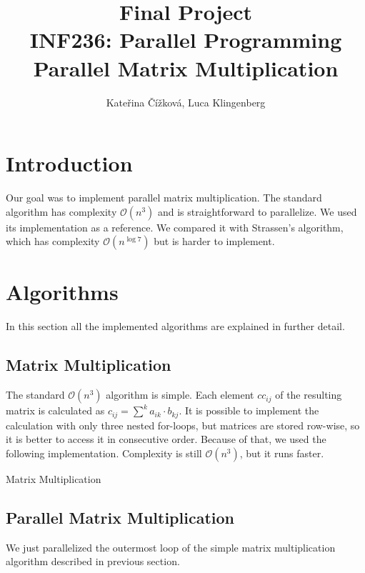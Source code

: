 \documentclass{article}
\title{Final Project\\ INF236: Parallel Programming\\ Parallel Matrix Multiplication}
\author{Kate\v{r}ina \v{C}\'{i}\v{z}kov\'{a}, Luca Klingenberg}
\begin{document}
\maketitle

\section{Introduction}
Our goal was to implement parallel matrix multiplication.
The standard algorithm has complexity $\mathcal{O}(n^3)$ and is straightforward
to parallelize. We used its implementation as a reference. We compared
it with Strassen’s algorithm, which has complexity $\mathcal{O}(n^{\log{}7})$
but is harder to implement.



\section{Algorithms}
In this section all the implemented algorithms are explained in further detail.

\subsection{Matrix Multiplication}
The standard $\mathcal{O}(n^3)$ algorithm is simple. Each element $cc_{ij}$ of 
the resulting matrix is calculated as $c_{ij} =\sum^k a_{ik} \cdot b_{kj}$.
It is possible to implement the calculation with only three nested for-loops, but 
matrices are stored row-wise, so it is better to access it in consecutive order.
Because of that, we used the following implementation. Complexity is still $\mathcal{O}(n^3)$,
but it runs faster.

\begin{algorithm}[H] 
\caption{Matrix Multiplication}
\label{alg:matmul}
\begin{algorithmic}[1]
\Statex
{}
		\EndFor
			\EndFor
		\EndFor
	\EndFor
	\State {}
\EndFunction
\end{algorithmic}
\end{algorithm}

\subsection{Parallel Matrix Multiplication}
We just parallelized the outermost loop of the simple matrix multiplication algorithm
described in previous section.
\end{document}
